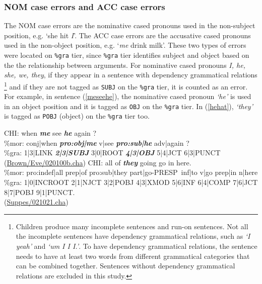 \subsubsection{NOM case errors and ACC case errors}
The NOM case errors are the nominative cased pronouns used in the non-subject position, e.g. `she hit \textit{I}'. The ACC case errors are the accusative cased pronouns used in the non-object position, e.g. `\textit{me} drink milk'. These two types of errors were located on \texttt{\%gra} tier, since \texttt{\%gra} tier identifies subject and object based on the the relationship between arguments. For nominative cased pronouns \textit{I, he, she, we, they}, if they appear in a sentence with dependency grammatical relations \footnote{Children produce many incomplete sentences and run-on sentences. Not all the incomplete sentences have dependency grammatical relations, such as \textit{`I yeah'} and \textit{`um I I I.'}. To have dependency grammatical relations, the sentence needs to have at least two words from different grammatical categories that can be combined together. Sentences without dependency grammatical relations are excluded in this study.} 
and if they are not tagged as \texttt{SUBJ} on the \texttt{\%gra} tier, it is counted as an error. For example, in sentence (\ref{meseehe}), the nominative cased pronoun \textit{`he'} is used in an object position and it is tagged as \texttt{OBJ} on the \texttt{\%gra} tier. In (\ref{hehat}), \textit{`they'} is tagged as \texttt{POBJ} (object) on the \texttt{\%gra} tier too. 
\begin{exe}
\ex \label{meseehe}\gll *CHI: when \textit{\textbf{me}} see \textit{\textbf{he}} again ?\\
\%mor: conj|when \textit{\textbf{pro:obj|me}} v|see \textit{\textbf{pro:sub|he}} adv|again ? \\
\%gra: 1|3|LINK \textbf{\textit{2|3|SUBJ}} 3|0|ROOT \textit{\textbf{4|3|OBJ}} 5|4|JCT 6|3|PUNCT \\
(\href{https://childes.talkbank.org/browser/index.php?url=Eng-NA/Brown/Eve/020100b.cha}{Brown/Eve/020100b.cha})
\ex \label{hehat}\gll *CHI: all of \textit{\textbf{they}} going go in here.\\
\%mor: pro:indef|all prep|of pro:sub|they part|go-PRESP~inf|to v|go prep|in n|here\\
\%gra: 1|0|INCROOT 2|1|NJCT 3|2|POBJ 4|3|XMOD 5|6|INF 6|4|COMP 7|6|JCT 8|7|POBJ 9|1|PUNCT.\\
(\href{https://childes.talkbank.org/browser/index.php?url=Eng-NA/Suppes/021021.cha}{Suppes/021021.cha})
\end{exe}
